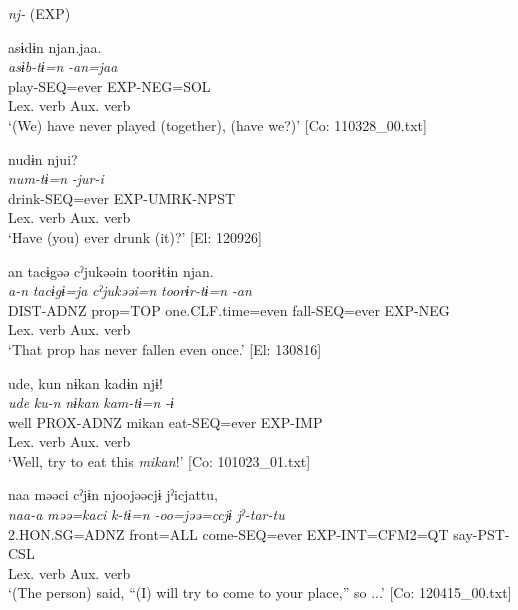 \ea   \textit{nj-} (EXP) \label{ex:9.10}

\ea %
 \gllll  asɨdɨn  njan.jaa.\\
      \textit{asɨb-tɨ=n}  \textit{-an=jaa}\\
      play-SEQ=ever  EXP-NEG=SOL\\
      Lex. verb  Aux. verb\\
      \glt       ‘(We) have never played (together), (have we?)’ [Co: 110328\_00.txt]

\ex \label{ex:9.10b} %
      \gllll    nudɨn  njui?\\
      \textit{num-tɨ=n}  \textit{-jur-i}\\
      drink-SEQ=ever  EXP-UMRK-NPST\\
      Lex. verb  Aux. verb\\
      \glt       ‘Have (you) ever drunk (it)?’ [El: 120926]

\ex \label{ex:9.10c} %
     \gllll an  tacɨgəə  cˀjukəəin  toorɨtɨn  njan.\\
      \textit{a-n}  \textit{tacɨgɨ=ja}  \textit{cˀjukəəi=n}  \textit{toorɨr-tɨ=n}  \textit{-an}\\
      DIST-ADNZ  prop=TOP  one.CLF.time=even  fall-SEQ=ever  EXP-NEG\\
            Lex. verb  Aux. verb\\
      \glt       ‘That prop has never fallen even once.’ [El: 130816]

\ex \label{ex:9.10d} %
   \gllll   ude,  kun  nɨkan  kadɨn  njɨ!\\
      \textit{ude}  \textit{ku-n}  \textit{nɨkan}  \textit{kam-tɨ=n}  \textit{-ɨ}\\
      well  PROX-ADNZ  mikan  eat-SEQ=ever  EXP-IMP\\
            Lex. verb  Aux. verb\\
      \glt       ‘Well, try to eat this \textit{mikan}!’ [Co: 101023\_01.txt]

\ex \label{ex:9.10e} %
   \gllll naa  məəci  cˀjɨn  njoojəəcjɨ    jˀicjattu,\\
      \textit{naa-a}  \textit{məə=kaci}  \textit{k-tɨ=n}  \textit{-oo=jəə=ccjɨ}   \textit{jˀ-tar-tu}\\
      2.HON.SG=ADNZ  front=ALL  come-SEQ=ever  EXP-INT=CFM2=QT  say-PST-CSL\\
          Lex. verb  Aux. verb\\          
      \glt ‘(The person) said, “(I) will try to come to your place,” so ...’    [Co: 120415\_00.txt]
    \z
\z

